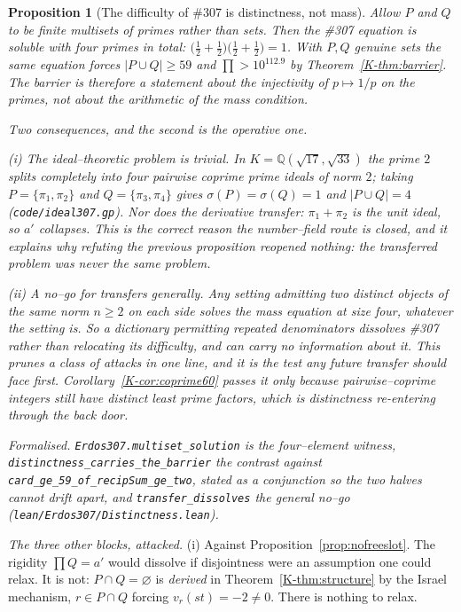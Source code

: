 \documentclass[11pt]{article}
\newtheorem{proposition}[theorem]{Proposition}
\theoremstyle{definition}
\begin{document}
\begin{proposition}[The difficulty of \#307 is distinctness, not mass]\label{prop:distinct}
Allow $P$ and $Q$ to be finite \emph{multisets} of primes rather than sets. Then the \#307 equation
is soluble with four primes in total:
$\bigl(\tfrac12+\tfrac12\bigr)\bigl(\tfrac12+\tfrac12\bigr)=1$. With $P,Q$ genuine sets the same
equation forces $|P\cup Q|\ge59$ and $\prod>10^{112.9}$ by Theorem~\ref{K-thm:barrier}. The barrier is
therefore a statement about the injectivity of $p\mapsto1/p$ on the primes, not about the arithmetic
of the mass condition.

Two consequences, and the second is the operative one.

\textup{(i)} \emph{The ideal--theoretic problem is trivial.} In $K=\mathbb{Q}(\sqrt{17},\sqrt{33})$
the prime $2$ splits completely into four pairwise coprime prime ideals of norm $2$; taking
$P=\{\pi_1,\pi_2\}$ and $Q=\{\pi_3,\pi_4\}$ gives $\sigma(P)=\sigma(Q)=1$ and $|P\cup Q|=4$
\textup{(\texttt{code/ideal307.gp})}. Nor does the derivative transfer: $\pi_1+\pi_2$ is the unit
ideal, so $a'$ collapses. This is the correct reason the number--field route is closed, and it
explains why refuting the previous proposition reopened nothing: the transferred problem was never
the same problem.

\textup{(ii)} \emph{A no--go for transfers generally.} Any setting admitting two distinct objects of
the same norm $n\ge2$ on each side solves the mass equation at size four, whatever the setting is.
So a dictionary permitting repeated denominators \emph{dissolves} \#307 rather than relocating its
difficulty, and can carry no information about it. This prunes a class of attacks in one line, and
it is the test any future transfer should face first. Corollary~\ref{K-cor:coprime60} passes it only
because pairwise--coprime integers still have distinct least prime factors, which is distinctness
re-entering through the back door.

\textup{Formalised.} \texttt{Erdos307.multiset\_solution} is the four--element witness,
\texttt{distinctness\_carries\_the\_barrier} the contrast against
\texttt{card\_ge\_59\_of\_recipSum\_ge\_two}, stated as a conjunction so the two halves cannot drift
apart, and \texttt{transfer\_dissolves} the general no--go
\textup{(\texttt{lean/Erdos307/Distinctness.lean})}.
\end{proposition}

\emph{The three other blocks, attacked.} \textup{(i) Against Proposition~\ref{prop:nofreeslot}.} The rigidity $\prod Q=a'$ would dissolve if
disjointness were an assumption one could relax. It is not: $P\cap Q=\varnothing$ is
\emph{derived} in Theorem~\ref{K-thm:structure} by the Israel mechanism, $r\in P\cap Q$ forcing
$v_r(st)=-2\neq0$. There is nothing to relax.
\end{document}
